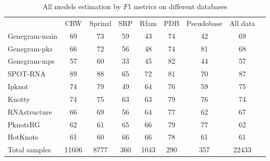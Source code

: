 \begin{table}
\centering
\caption{All models estimation by $F1$ metrics on different databases}
\begin{tabular}{@{}lcccccccc@{}}\toprule
& CRW & Sprinzl & SRP & Rfam & PDB & Pseudobase  & All data \\ \cmidrule{2-8} 
Genegram-main  & 69 & 73 & 59 & 43 & 74 & 42 & 69 \\
Genegram-pks  & 66 & 72 & 56 & 48 & 74 & 81 & 68 \\
Genegram-mps  & 57 & 60 & 33 & 45 & 82 & 44 & 57 \\
SPOT-RNA & 89 & 88 & 65 & 72 & 81 & 70 & 87 \\
Ipknot & 74 & 79 & 49 & 64 & 76 & 59 & 75 \\
Knotty & 74 & 75 & 63 & 63 & 79 & 76 & 74 \\
RNAstructure & 66 & 69 & 56 & 64 & 77 & 62 & 67 \\
PknotsRG & 62 & 61 & 65 & 66 & 79 & 77 & 62 \\
HotKnots & 61 & 60 & 66 & 66 & 78 & 61 & 61 \\
\bottomrule
Total samples & 11606 & 8777 & 360 & 1043 & 290 & 357 & 22433 \\
\bottomrule
\end{tabular}
\label{table_all}
\end{table}